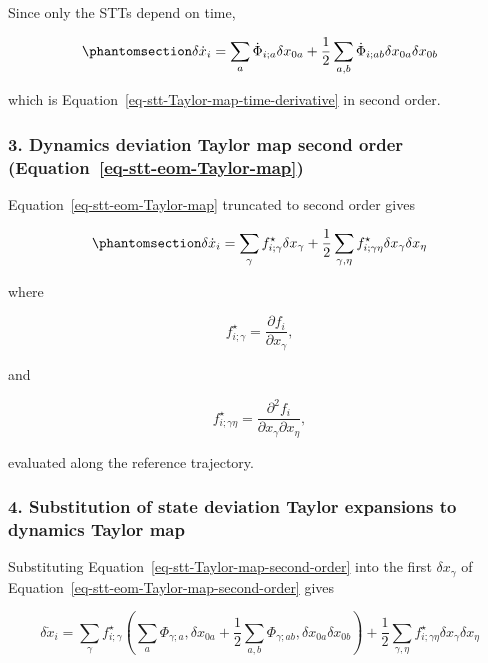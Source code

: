 \documentclass[
  letterpaper,
  DIV=11,
  numbers=noendperiod,
  oneside]{scrartcl}
\begin{document}
Since only the STTs depend on time,

\begin{equation}\protect\phantomsection\label{eq-stt-Taylor-map-time-derivative-second-order}{
\delta\dot x_i = \sum_a \dot\Phi_{i;a}\delta x_{0a} + \frac12\sum_{a,b}\dot\Phi_{i;ab}\delta x_{0a}\delta x_{0b}
}\end{equation}

which is Equation~\ref{eq-stt-Taylor-map-time-derivative} in second
order.

\subsubsection{\texorpdfstring{3. Dynamics deviation Taylor map second
order
(Equation~\ref{eq-stt-eom-Taylor-map})}{3. Dynamics deviation Taylor map second order (Equation~)}}\label{dynamics-deviation-taylor-map-second-order-eq-stt-eom-taylor-map}

Equation~\ref{eq-stt-eom-Taylor-map} truncated to second order gives

\begin{equation}\protect\phantomsection\label{eq-stt-eom-Taylor-map-second-order}{
\delta\dot x_i = \sum_{\gamma} f^\star_{i;\gamma}\delta x_\gamma + \frac12\sum_{\gamma,\eta} f^\star_{i;\gamma\eta}\delta x_\gamma\delta x_\eta
}\end{equation}

where

\[
f^\star_{i;\gamma}=\frac{\partial f_i}{\partial x_\gamma},
\]

and

\[
f^\star_{i;\gamma\eta}=\frac{\partial^2 f_i}{\partial x_\gamma \partial x_\eta},
\]

evaluated along the reference trajectory.

\subsubsection{4. Substitution of state deviation Taylor expansions to
dynamics Taylor
map}\label{substitution-of-state-deviation-taylor-expansions-to-dynamics-taylor-map}

Substituting Equation~\ref{eq-stt-Taylor-map-second-order} into the
first \(\delta x_{\gamma}\) of
Equation~\ref{eq-stt-eom-Taylor-map-second-order} gives

\[
\delta\dot x_i = \sum_{\gamma} f^\star_{i;\gamma}\left(\sum_a\Phi_{\gamma;a},\delta x_{0a} + \frac12\sum_{a,b}\Phi_{\gamma;ab},\delta x_{0a}\delta x_{0b}\right) + \frac12\sum_{\gamma,\eta} f^\star_{i;\gamma\eta}\delta x_\gamma\delta x_\eta
\]
\end{document}
